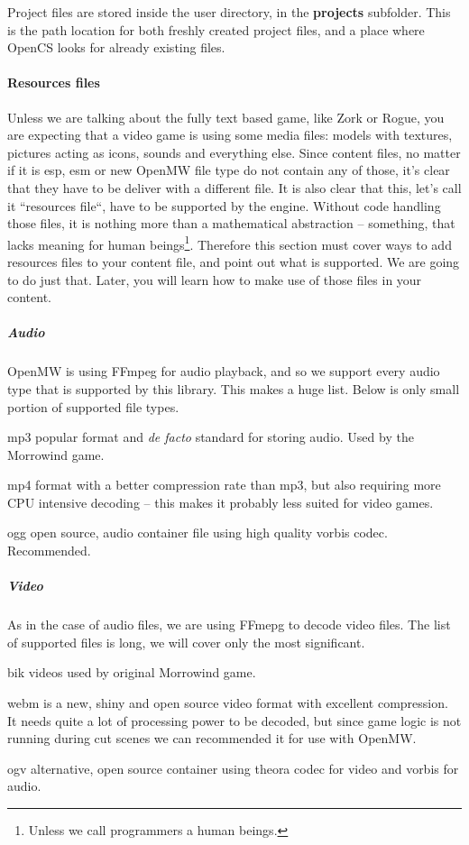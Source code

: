 Project files are stored inside the user directory, in the \textbf{projects} subfolder. This is the path location for both freshly created project files, and a place where Open{CS} looks for already existing files.\\

\paragraph{Resources files}
Unless we are talking about the fully text based game, like Zork or Rogue, you are expecting that a video game is using some media files: models with textures, pictures acting as icons, sounds and everything else. Since content files, no matter if it is esp, esm or new Open{MW} file type do not contain any of those, it's clear that they have to be deliver with a different file. It is also clear that this, let's call it ``resources file``, have to be supported by the engine. Without code handling those files, it is nothing more than a mathematical abstraction -- something, that lacks meaning for human beings\footnote{Unless we call programmers a human beings.}. Therefore this section must cover ways to add resources files to your content file, and point out what is supported. We are going to do just that. Later, you will learn how to make use of those files in your content.

\subparagraph{Audio}
Open{MW} is using {FF}mpeg for audio playback, and so we support every audio type that is supported by this library. This makes a huge list. Below is only small portion of supported file types.

\begin{description}
 \item mp3 popular format and \textit{de facto} standard for storing audio. Used by the Morrowind game.
 \item mp4 format with a better compression rate than mp3, but also requiring more {CPU} intensive decoding -- this makes it probably less suited for video games. 
 \item ogg open source, audio container file using high quality vorbis codec. Recommended.
\end{description}


\subparagraph{Video}
As in the case of audio files, we are using {FFmepg} to decode video files. The list of supported files is long, we will cover only the most significant.

\begin{description}
 \item bik videos used by original Morrowind game.
 \item webm is a new, shiny and open source video format with excellent compression. It needs quite a lot of processing power to be decoded, but since game logic is not running during cut scenes we can recommended it for use with Open{MW}.
 \item ogv alternative, open source container using theora codec for video and vorbis for audio.
\end{description}

